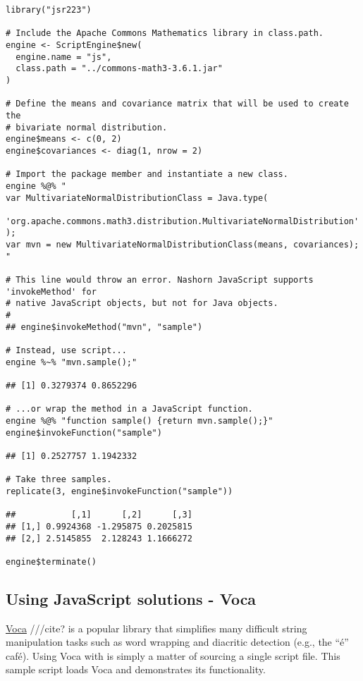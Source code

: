 \begin{verbatim}
library("jsr223")

# Include the Apache Commons Mathematics library in class.path.
engine <- ScriptEngine$new(
  engine.name = "js",
  class.path = "../commons-math3-3.6.1.jar"
)

# Define the means and covariance matrix that will be used to create the
# bivariate normal distribution.
engine$means <- c(0, 2)
engine$covariances <- diag(1, nrow = 2)

# Import the package member and instantiate a new class.
engine %@% "
var MultivariateNormalDistributionClass = Java.type(
  'org.apache.commons.math3.distribution.MultivariateNormalDistribution'
);
var mvn = new MultivariateNormalDistributionClass(means, covariances);
"

# This line would throw an error. Nashorn JavaScript supports 'invokeMethod' for
# native JavaScript objects, but not for Java objects.
# 
## engine$invokeMethod("mvn", "sample")

# Instead, use script...
engine %~% "mvn.sample();"

## [1] 0.3279374 0.8652296

# ...or wrap the method in a JavaScript function.
engine %@% "function sample() {return mvn.sample();}"
engine$invokeFunction("sample")

## [1] 0.2527757 1.1942332

# Take three samples.
replicate(3, engine$invokeFunction("sample"))

##           [,1]      [,2]      [,3]
## [1,] 0.9924368 -1.295875 0.2025815
## [2,] 2.5145855  2.128243 1.1666272

engine$terminate()
\end{verbatim}

\subsection{Using JavaScript solutions - Voca}

\href{https://vocajs.com/}{Voca} ///cite? is a popular library that simplifies many difficult string manipulation tasks such as word wrapping and diacritic detection (e.g., the “\'{e}” caf\'{e}). Using Voca with  is simply a matter of sourcing a single script file. This sample script loads Voca and demonstrates its functionality.

